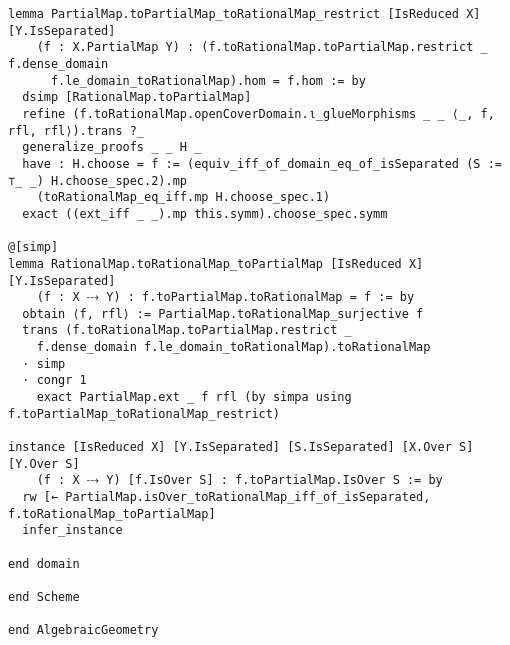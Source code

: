 \documentclass{article}
\begin{document}
\begin{lstlisting}[language=Lean, caption={RationalMap.lean}]
lemma PartialMap.toPartialMap_toRationalMap_restrict [IsReduced X] [Y.IsSeparated]
    (f : X.PartialMap Y) : (f.toRationalMap.toPartialMap.restrict _ f.dense_domain
      f.le_domain_toRationalMap).hom = f.hom := by
  dsimp [RationalMap.toPartialMap]
  refine (f.toRationalMap.openCoverDomain.ι_glueMorphisms _ _ ⟨_, f, rfl, rfl⟩).trans ?_
  generalize_proofs _ _ H _
  have : H.choose = f := (equiv_iff_of_domain_eq_of_isSeparated (S := ⊤_ _) H.choose_spec.2).mp
    (toRationalMap_eq_iff.mp H.choose_spec.1)
  exact ((ext_iff _ _).mp this.symm).choose_spec.symm

@[simp]
lemma RationalMap.toRationalMap_toPartialMap [IsReduced X] [Y.IsSeparated]
    (f : X ⤏ Y) : f.toPartialMap.toRationalMap = f := by
  obtain ⟨f, rfl⟩ := PartialMap.toRationalMap_surjective f
  trans (f.toRationalMap.toPartialMap.restrict _
    f.dense_domain f.le_domain_toRationalMap).toRationalMap
  · simp
  · congr 1
    exact PartialMap.ext _ f rfl (by simpa using f.toPartialMap_toRationalMap_restrict)

instance [IsReduced X] [Y.IsSeparated] [S.IsSeparated] [X.Over S] [Y.Over S]
    (f : X ⤏ Y) [f.IsOver S] : f.toPartialMap.IsOver S := by
  rw [← PartialMap.isOver_toRationalMap_iff_of_isSeparated, f.toRationalMap_toPartialMap]
  infer_instance

end domain

end Scheme

end AlgebraicGeometry

\end{lstlisting}
\end{document}
